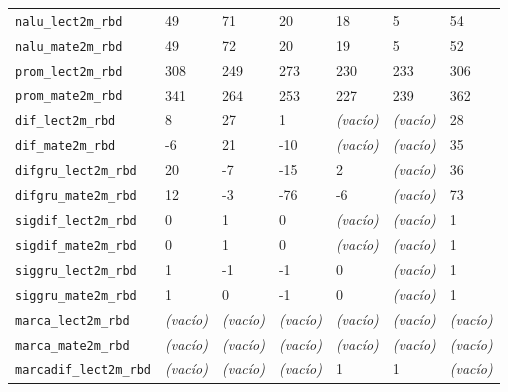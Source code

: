 \documentclass[10pt]{article}
\begin{document}
\begin{xltabular}{\linewidth}{@{}p{4.3cm} Y Y Y Y Y Y @{}}
\texttt{nalu\_\allowbreak{}lect2m\_\allowbreak{}rbd} & 49 & 71 & 20 & 18 & 5 & 54 \\
\texttt{nalu\_\allowbreak{}mate2m\_\allowbreak{}rbd} & 49 & 72 & 20 & 19 & 5 & 52 \\
\texttt{prom\_\allowbreak{}lect2m\_\allowbreak{}rbd} & 308 & 249 & 273 & 230 & 233 & 306 \\
\texttt{prom\_\allowbreak{}mate2m\_\allowbreak{}rbd} & 341 & 264 & 253 & 227 & 239 & 362 \\
\texttt{dif\_\allowbreak{}lect2m\_\allowbreak{}rbd} & 8 & 27 & 1 & \textit{\color{gris}(vacío)} & \textit{\color{gris}(vacío)} & 28 \\
\texttt{dif\_\allowbreak{}mate2m\_\allowbreak{}rbd} & -{}6 & 21 & -{}10 & \textit{\color{gris}(vacío)} & \textit{\color{gris}(vacío)} & 35 \\
\texttt{difgru\_\allowbreak{}lect2m\_\allowbreak{}rbd} & 20 & -{}7 & -{}15 & 2 & \textit{\color{gris}(vacío)} & 36 \\
\texttt{difgru\_\allowbreak{}mate2m\_\allowbreak{}rbd} & 12 & -{}3 & -{}76 & -{}6 & \textit{\color{gris}(vacío)} & 73 \\
\texttt{sigdif\_\allowbreak{}lect2m\_\allowbreak{}rbd} & 0 & 1 & 0 & \textit{\color{gris}(vacío)} & \textit{\color{gris}(vacío)} & 1 \\
\texttt{sigdif\_\allowbreak{}mate2m\_\allowbreak{}rbd} & 0 & 1 & 0 & \textit{\color{gris}(vacío)} & \textit{\color{gris}(vacío)} & 1 \\
\texttt{siggru\_\allowbreak{}lect2m\_\allowbreak{}rbd} & 1 & -{}1 & -{}1 & 0 & \textit{\color{gris}(vacío)} & 1 \\
\texttt{siggru\_\allowbreak{}mate2m\_\allowbreak{}rbd} & 1 & 0 & -{}1 & 0 & \textit{\color{gris}(vacío)} & 1 \\
\texttt{marca\_\allowbreak{}lect2m\_\allowbreak{}rbd} & \textit{\color{gris}(vacío)} & \textit{\color{gris}(vacío)} & \textit{\color{gris}(vacío)} & \textit{\color{gris}(vacío)} & \textit{\color{gris}(vacío)} & \textit{\color{gris}(vacío)} \\
\texttt{marca\_\allowbreak{}mate2m\_\allowbreak{}rbd} & \textit{\color{gris}(vacío)} & \textit{\color{gris}(vacío)} & \textit{\color{gris}(vacío)} & \textit{\color{gris}(vacío)} & \textit{\color{gris}(vacío)} & \textit{\color{gris}(vacío)} \\
\texttt{marcadif\_\allowbreak{}lect2m\_\allowbreak{}rbd} & \textit{\color{gris}(vacío)} & \textit{\color{gris}(vacío)} & \textit{\color{gris}(vacío)} & 1 & 1 & \textit{\color{gris}(vacío)} \\

\end{xltabular}
\end{document}
